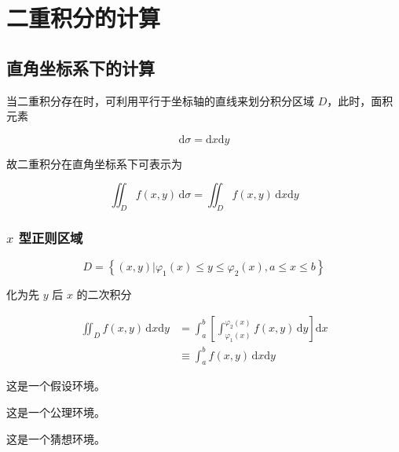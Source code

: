 \documentclass[lang = zh , final , oneside , openany , titlepage , zihao = -4 , linespread = 1.3 , baselineskip = false , cjk-font = windows , text-font = newtx , math-font = newtx]{sjtureport}
\begin{document}
\section{二重积分的计算}

\subsection{直角坐标系下的计算}

当二重积分存在时，可利用平行于坐标轴的直线来划分积分区域 $D$，此时，面积元素

$$
\mathrm{d}\sigma = \mathrm{d}x\mathrm{d}y
$$

故二重积分在直角坐标系下可表示为

$$
\iint_D f(x,y)\,\mathrm{d}\sigma = \iint_D f(x,y)\,\mathrm{d}x\mathrm{d}y
$$

\subsubsection{$x$ 型正则区域}

$$
D = \left\{(x,y)\bigg| \varphi_1(x)\leq y\leq \varphi_2(x),a\leq x\leq b\right\}
$$

化为先 $y$ 后 $x$ 的二次积分

$$
\begin{aligned}
    \iint_D f(x,y)\,\mathrm{d}x\mathrm{d}y &= \int_a^b\left[\int_{\varphi_1(x)}^{\varphi_2(x)} f(x,y)\,\mathrm{d}y\right]\mathrm{d}x \\
    &\equiv \int_a^b f(x,y)\,\mathrm{d}x\mathrm{d}y
\end{aligned}
$$

\begin{assumption}
    这是一个假设环境。
\end{assumption}

\begin{axiom}
    这是一个公理环境。
\end{axiom}

\begin{conjecture}
    这是一个猜想环境。
\end{conjecture}

\nocite{*}

\end{document}

